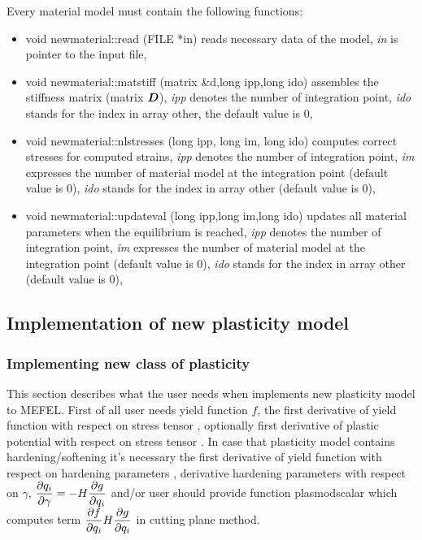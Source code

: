 Every material model must contain the following functions:
\begin{itemize}
\item{
{\sf void newmaterial::read (FILE *in)}
\newline reads necessary data of the model, {\it in} is pointer to the input file,
}
\item{
{\sf void newmaterial::matstiff (matrix \&d,long ipp,long ido)}
\newline assembles the stiffness matrix (matrix $\mbox{\boldmath$D$}$), {\it ipp}
denotes the number of integration point, {\it ido} stands for the
index in array {\sf other}, the default value is 0,
}
\item{
{\sf void newmaterial::nlstresses (long ipp, long im, long ido)}
\newline computes correct stresses for computed strains,
{\it ipp} denotes the number of integration point,
{\it im} expresses the number of material model at the integration point (default value is 0),
{\it ido} stands for the index in array {\sf other} (default value is 0),
}
\item{
{\sf void newmaterial::updateval (long ipp,long im,long ido)}
\newline updates all material parameters when the equilibrium is reached,
{\it ipp} denotes the number of integration point,
{\it im} expresses the number of material model at the integration point (default value is 0),
{\it ido} stands for the index in array {\sf other} (default value is 0),
}
\end{itemize}

\subsection{Implementation of new plasticity model}
\subsubsection {Implementing new class of plasticity}
This section describes what the user needs when implements new plasticity model
to MEFEL. First of all user needs yield function $f$, the first derivative of yield function with
respect on stress tensor , optionally first derivative of plastic potential
with respect on stress tensor . In case that plasticity model
contains hardening/softening it's necessary the first derivative of yield function with
respect on hardening parameters , derivative hardening parameters with respect
on $\gamma$, $\mbox{$\displaystyle\frac{\partial{q_i}}{\partial{\gamma}}$}=-H\mbox{$\displaystyle\frac{\partial{g}}{\partial{q_i}}$}$ and/or user should provide function {\sf plasmodscalar}
which computes term $\mbox{$\displaystyle\frac{\partial{f}}{\partial{q_i}}$}H\mbox{$\displaystyle\frac{\partial{g}}{\partial{q_i}}$}$ in cutting plane method.

